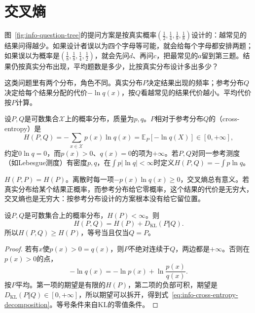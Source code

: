 \section{交叉熵}
\label{sec:info-cross-entropy}

图~\ref{fig:info-question-tree}的提问方案是按真实概率$(\tfrac12,\tfrac14,\tfrac18,\tfrac18)$设计的：越常见的结果问得越少。如果设计者误以为四个字母等可能，就会给每个字母都安排两题；如果误以为概率是$(\tfrac18,\tfrac18,\tfrac14,\tfrac12)$，就会先问$d$、再问$c$，把最常见的$a$留到第三题。结果仍按真实分布出现，平均题数是多少，比按真实分布设计多出多少？

这类问题里有两个分布，角色不同。真实分布$P$决定结果出现的频率；参考分布$Q$决定给每个结果分配的代价$-\ln q(x)$，按$Q$看越常见的结果代价越小。平均代价按$P$计算。

\begin{definition}[交叉熵]
\label{def:info-cross-entropy}
设$P,Q$是可数集合$\mathcal{X}$上的概率分布，质量为$p,q$。$P$相对于参考分布$Q$的（cross-entropy）是
\begin{equation}
  H(P,Q)=-\sum_{x\in\mathcal{X}}p(x)\ln q(x)=\mathbb{E}_{P}[-\ln q(X)]\in[0,+\infty],
  \label{eq:info-cross-entropy}
\end{equation}
约定$0\ln q=0$，而$p(x)>0$、$q(x)=0$的项为$+\infty$。若$P,Q$对同一参考测度（如Lebesgue测度）有密度$p,q$，在$\int p\lvert\ln q\rvert<\infty$时定义$H(P,Q)=-\int p\ln q$。
\end{definition}

$H(P,P)=H(P)$。离散时每一项$-p(x)\ln q(x)\geq0$，交叉熵总有意义。若真实分布给某个结果正概率，而参考分布给它零概率，这个结果的代价是无穷大，交叉熵也是无穷大：按参考分布设计的方案根本没有给它留位置。

\begin{theorem}[交叉熵的分解]
\label{thm:info-cross-entropy-decomposition}
设$P,Q$是可数集合上的概率分布，$H(P)<\infty$。则
\begin{equation}
  H(P,Q)=H(P)+D_{\mathrm{KL}}(P\Vert Q).
  \label{eq:info-cross-entropy-decomposition}
\end{equation}
所以$H(P,Q)\geq H(P)$，等号当且仅当$Q=P$。
\end{theorem}

\begin{proof}
若有$x$使$p(x)>0=q(x)$，则$P$不绝对连续于$Q$，两边都是$+\infty$。否则在$p(x)>0$的点，
\[
  -\ln q(x)=-\ln p(x)+\ln\frac{p(x)}{q(x)}.
\]
按$P$平均。第一项的期望是有限的$H(P)$，第二项的负部可积，期望是$D_{\mathrm{KL}}(P\Vert Q)\in[0,+\infty]$，所以期望可以拆开，得到式~\eqref{eq:info-cross-entropy-decomposition}。等号条件来自KL的零值条件。
\end{proof}


